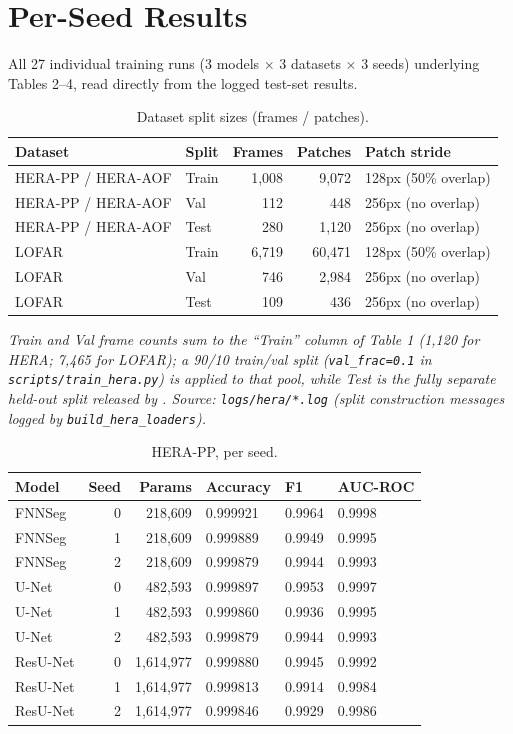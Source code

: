 \documentclass[11pt]{article}
\begin{document}
\appendix
\section{Per-Seed Results}

All 27 individual training runs (3 models $\times$ 3 datasets $\times$ 3 seeds) underlying Tables 2--4, read directly from the logged test-set results.

\begin{table}[h]
\centering
\caption{Dataset split sizes (frames / patches).}
\begin{tabular}{llrrl}
\toprule
Dataset & Split & Frames & Patches & Patch stride \\
\midrule
HERA-PP / HERA-AOF & Train & 1,008 & 9,072 & 128px (50\% overlap) \\
HERA-PP / HERA-AOF & Val & 112 & 448 & 256px (no overlap) \\
HERA-PP / HERA-AOF & Test & 280 & 1,120 & 256px (no overlap) \\
LOFAR & Train & 6,719 & 60,471 & 128px (50\% overlap) \\
LOFAR & Val & 746 & 2,984 & 256px (no overlap) \\
LOFAR & Test & 109 & 436 & 256px (no overlap) \\
\bottomrule
\end{tabular}
\end{table}

\emph{Train and Val frame counts sum to the ``Train'' column of Table 1 (1,120 for HERA; 7,465 for LOFAR); a 90/10 train/val split (\texttt{val\_frac=0.1} in \texttt{scripts/train\_hera.py}) is applied to that pool, while Test is the fully separate held-out split released by \citet{dutoit2023}. Source: \texttt{logs/hera/*.log} (split construction messages logged by \texttt{build\_hera\_loaders}).}

\begin{table}[h]
\centering
\caption{HERA-PP, per seed.}
\begin{tabular}{lrrlll}
\toprule
Model & Seed & Params & Accuracy & F1 & AUC-ROC \\
\midrule
FNNSeg & 0 & 218,609 & 0.999921 & 0.9964 & 0.9998 \\
FNNSeg & 1 & 218,609 & 0.999889 & 0.9949 & 0.9995 \\
FNNSeg & 2 & 218,609 & 0.999879 & 0.9944 & 0.9993 \\
U-Net & 0 & 482,593 & 0.999897 & 0.9953 & 0.9997 \\
U-Net & 1 & 482,593 & 0.999860 & 0.9936 & 0.9995 \\
U-Net & 2 & 482,593 & 0.999879 & 0.9944 & 0.9993 \\
ResU-Net & 0 & 1,614,977 & 0.999880 & 0.9945 & 0.9992 \\
ResU-Net & 1 & 1,614,977 & 0.999813 & 0.9914 & 0.9984 \\
ResU-Net & 2 & 1,614,977 & 0.999846 & 0.9929 & 0.9986 \\
\bottomrule
\end{tabular}
\end{table}
\end{document}
